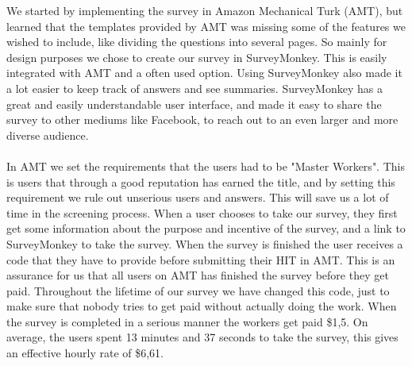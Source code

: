 We started by implementing the survey in Amazon Mechanical Turk (AMT), but learned that the templates provided by AMT was missing some of the features we wished to include, like dividing the questions into several pages. So mainly for design purposes we chose to create our survey in SurveyMonkey. This is easily integrated with AMT and a often used option.  Using SurveyMonkey also made it a lot easier to keep track of answers and see summaries. SurveyMonkey has a great and easily understandable user interface, and made it easy to share the survey to other mediums like Facebook, to reach out to an even larger and more diverse audience. 

\paragraph{}
In AMT we set the requirements that the users had to be "Master Workers". This is users that through a good reputation has earned the title, and by setting this requirement we rule out unserious users and answers. This will save us a lot of time in the screening process. When a user chooses to take our survey, they first get some information about the purpose and incentive of the survey, and a link to SurveyMonkey to take the survey. When the survey is finished the user receives a code that they have to provide before submitting their HIT in AMT. This is an assurance for us that all users on AMT has finished the survey before they get paid. Throughout the lifetime of our survey we have changed this code, just to make sure that nobody tries to get paid without actually doing the work. When the survey is completed in a serious manner the workers get paid \$1,5. On average, the users spent 13 minutes and 37 seconds to take the survey, this gives an effective hourly rate of \$6,61.     
